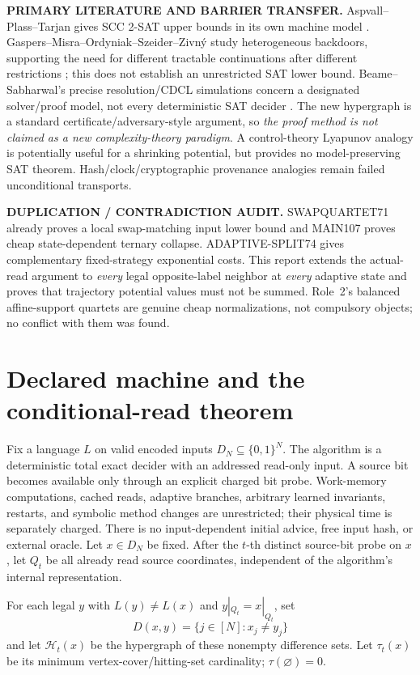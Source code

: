 \documentclass[11pt]{article}
\begin{document}
\par\noindent\textbf{PRIMARY LITERATURE AND BARRIER TRANSFER.}
Aspvall--Plass--Tarjan gives SCC 2-SAT upper bounds in its own machine
model \cite{apt}. Gaspers--Misra--Ordyniak--Szeider--Zivn\'y study
heterogeneous backdoors, supporting the need for different tractable
continuations after different restrictions \cite{hetero}; this does not
establish an unrestricted SAT lower bound. Beame--Sabharwal's precise
resolution/CDCL simulations concern a designated solver/proof model, not
every deterministic SAT decider \cite{cdcl}. The new hypergraph is a
standard certificate/adversary-style argument, so \emph{the proof method
is not claimed as a new complexity-theory paradigm}. A control-theory
Lyapunov analogy is potentially useful for a shrinking potential, but
provides no model-preserving SAT theorem. Hash/clock/cryptographic
provenance analogies remain failed unconditional transports.

\par\noindent\textbf{DUPLICATION / CONTRADICTION AUDIT.}
SWAPQUARTET71 already proves a local swap-matching input lower bound and
MAIN107 proves cheap state-dependent ternary collapse. ADAPTIVE-SPLIT74
gives complementary fixed-strategy exponential costs.
This report extends the actual-read argument to \emph{every} legal
opposite-label neighbor at \emph{every} adaptive state and proves that
trajectory potential values must not be summed. Role~2's balanced
affine-support quartets are genuine cheap normalizations, not compulsory
objects; no conflict with them was found.

\section{Declared machine and the conditional-read theorem}
Fix a language $L$ on valid encoded inputs $D_N\subseteq\{0,1\}^{N}$.
The algorithm is a deterministic total exact decider with an addressed
read-only input. A source bit becomes available only through an explicit
charged bit probe. Work-memory computations, cached reads, adaptive
branches, arbitrary learned invariants, restarts, and symbolic method
changes are unrestricted; their physical time is separately charged.
There is no input-dependent initial advice, free input hash, or external
oracle. Let $x\in D_N$ be fixed. After the $t$-th distinct source-bit
probe on $x$, let $Q_t$ be all already read source coordinates, independent
of the algorithm's internal representation.

For each legal $y$ with $L(y)\ne L(x)$ and
$y|_{Q_t}=x|_{Q_t}$, set
\[
D(x,y)=\{j\in[N]:x_j\ne y_j\}
\]
and let $\mathcal H_t(x)$ be the hypergraph of these nonempty
difference sets. Let $\tau_t(x)$ be its minimum vertex-cover/hitting-set
cardinality; $\tau(\varnothing)=0$.
\end{document}
